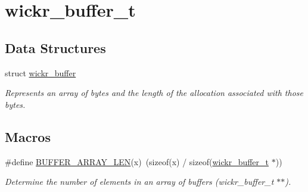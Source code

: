 \hypertarget{group__wickr__buffer}{}\section{wickr\+\_\+buffer\+\_\+t}
\label{group__wickr__buffer}
\subsection*{Data Structures}
\begin{DoxyCompactItemize}
\item 
struct \mbox{\hyperlink{structwickr__buffer}{wickr\+\_\+buffer}}
\begin{DoxyCompactList}\small\item\em Represents an array of bytes and the length of the allocation associated with those bytes. \end{DoxyCompactList}\end{DoxyCompactItemize}
\subsection*{Macros}
\begin{DoxyCompactItemize}
\item 
\#define \mbox{\hyperlink{group__wickr__buffer_ga0cf6db371b58617c9311f2a357d98164}{B\+U\+F\+F\+E\+R\+\_\+\+A\+R\+R\+A\+Y\+\_\+\+L\+EN}}(x)~(sizeof(x) / sizeof(\mbox{\hyperlink{structwickr__buffer}{wickr\+\_\+buffer\+\_\+t}} $\ast$))
\begin{DoxyCompactList}\small\item\em Determine the number of elements in an array of buffers (wickr\+\_\+buffer\+\_\+t $\ast$$\ast$). \end{DoxyCompactList}\end{DoxyCompactItemize}
